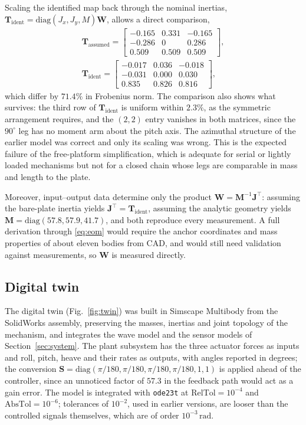 \documentclass[]{IAC_style}
\newcommand{\W}{\bm{W}}
\newcommand{\Mmat}{\bm{M}}
\newcommand{\Jmat}{\bm{J}}
\newcommand{\un}[1]{\,\mathrm{#1}}
\begin{document}
Scaling the identified map back through the nominal inertias, $\bm{T}_\mathrm{ident}=\mathrm{diag}(J_x,J_y,M)\W$, allows a direct comparison,
\begin{equation}
\begin{gathered}
\bm{T}_\mathrm{assumed}=\begin{bmatrix}
-0.165 & 0.331 & -0.165\\
-0.286 & 0 & 0.286\\
0.509 & 0.509 & 0.509\end{bmatrix},\\
\bm{T}_\mathrm{ident}=\begin{bmatrix}
-0.017 & 0.036 & -0.018\\
-0.031 & 0.000 & 0.030\\
0.835 & 0.826 & 0.816\end{bmatrix},
\end{gathered}
\label{eq:Tcompare}
\end{equation}
which differ by $71.4\%$ in Frobenius norm. The comparison also shows what survives: the third row of $\bm{T}_\mathrm{ident}$ is uniform within $2.3\%$, as the symmetric arrangement requires, and the $(2,2)$ entry vanishes in both matrices, since the $90^\circ$ leg has no moment arm about the pitch axis. The azimuthal structure of the earlier model was correct and only its scaling was wrong. This is the expected failure of the free-platform simplification, which is adequate for serial or lightly loaded mechanisms but not for a closed chain whose legs are comparable in mass and length to the plate.

Moreover, input--output data determine only the product $\W=\Mmat^{-1}\Jmat^\top$: assuming the bare-plate inertia yields $\Jmat^\top=\bm{T}_\mathrm{ident}$, assuming the analytic geometry yields $\Mmat=\mathrm{diag}(57.8,57.9,41.7)$, and both reproduce every measurement. A full derivation through \eqref{eq:eom} would require the anchor coordinates and mass properties of about eleven bodies from CAD, and would still need validation against measurements, so $\W$ is measured directly.

\subsection{Digital twin}
The digital twin (Fig.~\ref{fig:twin}) was built in Simscape Multibody \cite{simscape} from the SolidWorks assembly, preserving the masses, inertias and joint topology of the mechanism, and integrates the wave model and the sensor models of Section~\ref{sec:system}. The plant subsystem has the three actuator forces as inputs and roll, pitch, heave and their rates as outputs, with angles reported in degrees; the conversion $\bm{S}=\mathrm{diag}(\pi/180,\pi/180,\pi/180,\pi/180,1,1)$ is applied ahead of the controller, since an unnoticed factor of $57.3$ in the feedback path would act as a gain error. The model is integrated with \texttt{ode23t} at $\mathrm{RelTol}=10^{-4}$ and $\mathrm{AbsTol}=10^{-6}$; tolerances of $10^{-2}$, used in earlier versions, are looser than the controlled signals themselves, which are of order $10^{-3}\un{rad}$.
\end{document}
